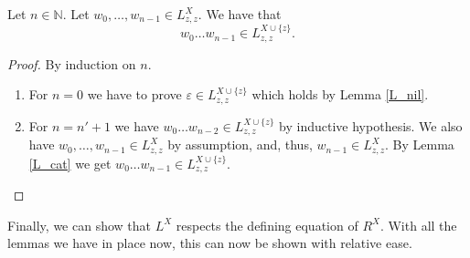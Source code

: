 
\begin{lemma}
    \label{L_flatten}
    Let $n \in \mathbb{N}$. Let $w_0, \ldots, w_{n-1} \in L^{X}_{z,z}$.
    We have that
    \begin{equation*}
        w_0 \ldots w_{n-1} \in L^{X\cup\{z\}}_{z,z}.
    \end{equation*}
\end{lemma}
\begin{proof}
    By induction on $n$.
    \begin{enumerate}
        \item For $n = 0$ we have to prove $\varepsilon \in L^{X\cup\{z\}}_{z,z}$ which holds by Lemma \ref{L_nil}.
        \item For $n = n'+1$ we have $w_0 \ldots w_{n-2} \in L^{X\cup\{z\}}_{z,z}$ by inductive hypothesis.
            We also have $w_0, \ldots, w_{n-1} \in L^{X}_{z,z}$ by assumption, and, thus, $w_{n-1} \in L^{X}_{z,z}$.
            By Lemma \ref{L_cat} we get $w_0 \ldots w_{n-1} \in L^{X\cup\{z\}}_{z,z}$.
    \end{enumerate}
\end{proof}



Finally, we can show that $L^X$ respects the defining equation of $R^X$.
With all the lemmas we have in place now, this can now be shown with relative ease.


